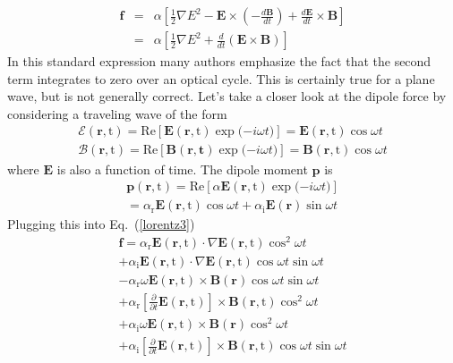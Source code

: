 \documentclass[twocolumn,english,pra,aps,superscriptaddress,floatfix]{revtex4-1}
\begin{document}
\begin{eqnarray}
\mathbf{f} &=& \alpha\left[\frac{1}{2}\nabla E^2-\mathbf{E}\times\left(-\frac{d\mathbf{B}}{dt}\right)+\frac{d\mathbf{E}}{dt}\times\mathbf{B}\right] \nonumber \\
 &=& \alpha\left[\frac{1}{2}\nabla E^2+\frac{d}{dt}\left(\mathbf{E}\times\mathbf{B}\right)\right]
\label{lorentz4}
\end{eqnarray}
In this standard expression \cite{Berry,hinds,loudon3} many authors emphasize the fact that the second term integrates to zero over an optical cycle.  This is certainly true for a plane wave, but is not generally correct. Let's take a closer look at the dipole force by considering a traveling wave of the form
\begin{align}
&\mathbf{\mathcal{E}}(\mathbf{r},\mathrm{t})=\mathrm{Re}\left[\mathbf{E}(\mathbf{r},\mathrm{t})\exp{(-i\omega t})\right]=\mathbf{E}(\mathbf{r},\mathrm{t})\cos{\omega t}& \nonumber \\
&\mathbf{\mathcal{B}}(\mathbf{r},\mathrm{t})=\mathrm{Re}\left[\mathbf{B}(\mathbf{r},\mathbf{t})\exp{(-i\omega t})\right]=\mathbf{B}(\mathbf{r},\mathrm{t})\cos{\omega t}&
\label{fields2}
\end{align}
where $\mathbf{E}$ is also a function of time.  The dipole moment $\mathbf{p}$ is
\begin{align}
&\mathbf{p}(\mathbf{r},\mathrm{t})=\mathrm{Re}\left[\alpha\mathbf{E}(\mathbf{r},\mathrm{t})\exp{(-i\omega t})\right]& \nonumber \\
&=\alpha_{\mathrm{r}}\mathbf{E}(\mathbf{r},\mathrm{t})\cos{\omega t} + \alpha_{\mathrm{i}}\mathbf{E}(\mathbf{r})\sin{\omega t}&
\label{dipole2}
\end{align}
Plugging this into Eq.\ (\ref{lorentz3})
\begin{align}
&\mathbf{f}=\alpha_{\mathrm{r}}\mathbf{E}(\mathbf{r},\mathrm{t})\cdot\nabla\mathbf{E}(\mathbf{r},\mathrm{t})\cos^2{\omega t}& \nonumber \\
&+\alpha_{\mathrm{i}}\mathbf{E}(\mathbf{r},\mathrm{t})\cdot\nabla\mathbf{E}(\mathbf{r},\mathrm{t})\cos{\omega t}\sin{\omega t}& \nonumber \\
& -\alpha_{\mathrm{r}}\omega\mathbf{E}(\mathbf{r},\mathrm{t})\times\mathbf{B}(\mathbf{r})\cos{\omega t}\sin{\omega t}& \nonumber \\
&+
\alpha_{\mathrm{r}}\left[\frac{\partial}{\partial t}\mathbf{E}(\mathbf{r},\mathrm{t})\right]\times\mathbf{B}(\mathbf{r},\mathrm{t})\cos^2{\omega t}& \nonumber \\
&+\alpha_{\mathrm{i}}\omega\mathbf{E}(\mathbf{r},\mathrm{t})\times\mathbf{B}(\mathbf{r})\cos^2{\omega t}& \nonumber \\
&+
\alpha_{\mathrm{i}}\left[\frac{\partial}{\partial t}\mathbf{E}(\mathbf{r},\mathrm{t})\right]\times\mathbf{B}(\mathbf{r},\mathrm{t})\cos{\omega t}\sin{\omega t}&
\end{align}
\end{document}
